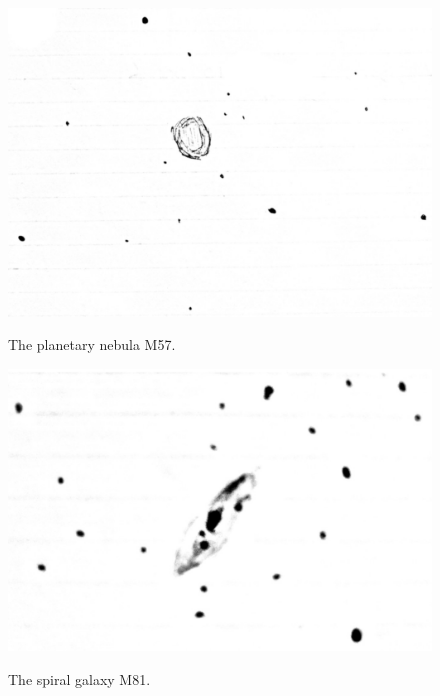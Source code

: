 \documentclass[11pt]{article}
\begin{document}
\begin{figure}[H]
\caption{The planetary nebula M57.}
\begin{center}
\includegraphics[scale=0.5]{figures/m57.jpg}
\label{fig:m57}
\end{center}
\end{figure}

\begin{figure}[H]
\caption{The spiral galaxy M81.}
\begin{center}
\includegraphics[scale=0.5]{figures/m81.jpg}
\label{fig:m81}
\end{center}
\end{figure}


\printbibliography
\end{document}
